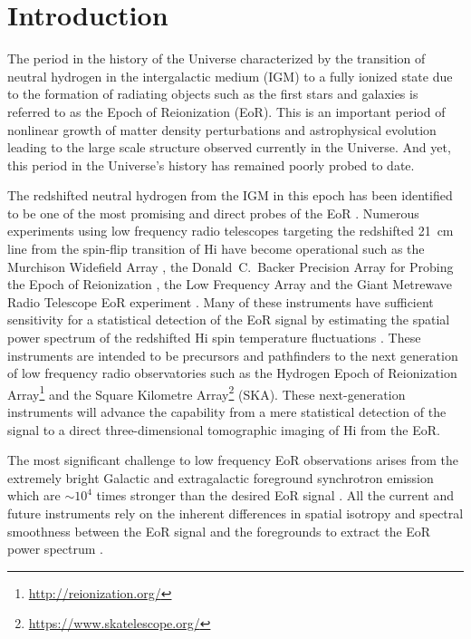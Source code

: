 \documentclass[preprint2,iop,numberedappendix,twocolappendix,appendixfloats]{emulateapj}
\begin{document}

\section{Introduction}\label{intro}

The period in the history of the Universe characterized by the transition of neutral hydrogen in the intergalactic medium (IGM) to a fully ionized state due to the formation of radiating objects such as the first stars and galaxies is referred to as the Epoch of Reionization (EoR). This is an important period of nonlinear growth of matter density perturbations and astrophysical evolution leading to the large scale structure observed currently in the Universe. And yet, this period in the Universe's history has remained poorly probed to date. 

The redshifted neutral hydrogen from the IGM in this epoch has been identified to be one of the most promising and direct probes of the EoR \citep{sun72,sco90,mad97,toz00,ili02}. Numerous experiments using low frequency radio telescopes targeting the redshifted 21~cm line from the spin-flip transition of H{\sc i} have become operational such as the Murchison Widefield Array \citep[MWA;][]{lon09,bow13,tin13}, the Donald~C.~Backer Precision Array for Probing the Epoch of Reionization \citep[PAPER;][]{par10}, the Low Frequency Array \citep[LOFAR;][]{van13} and the Giant Metrewave Radio Telescope EoR experiment \citep[GMRT;][]{pac13}. Many of these instruments have sufficient sensitivity for a statistical detection of the EoR signal by estimating the spatial power spectrum of the redshifted H{\sc i} spin temperature fluctuations \citep{bea13,thy13}. These instruments are intended to be precursors and pathfinders to the next generation of low frequency radio observatories such as the Hydrogen Epoch of Reionization Array\footnote{\url{http://reionization.org/}} \citep[HERA;][]{deb16} and the Square Kilometre Array\footnote{\url{https://www.skatelescope.org/}} (SKA). These next-generation instruments will advance the capability from a mere statistical detection of the signal to a direct three-dimensional tomographic imaging of H{\sc i} from the EoR. 

The most significant challenge to low frequency EoR observations arises from the extremely bright Galactic and extragalactic foreground synchrotron emission which are $\sim 10^4$ times stronger than the desired EoR signal \citep{dim02,ali08,ber09,ber10,gho12}. All the current and future instruments rely on the inherent differences in spatial isotropy and spectral smoothness between the EoR signal and the foregrounds to extract the EoR power spectrum \citep[see, e.g.,][]{fur04b,mor04,zal04,san05,fur06,mcq06,mor06,wan06,gle08}. 
\end{document}
